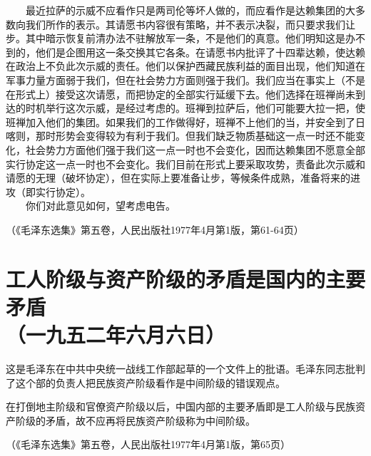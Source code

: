 \documentclass[cn,11pt,chinese]{elegantbook}
\def\myformat#1{\hfil\hfil #1}
\begin{document}
　　最近拉萨的示威不应看作只是两司伦等坏人做的，而应看作是达赖集团的大多数向我们所作的表示。其请愿书内容很有策略，并不表示决裂，而只要求我们让步。其中暗示恢复前清办法不驻解放军一条，不是他们的真意。他们明知这是办不到的，他们是企图用这一条交换其它各条。在请愿书内批评了十四辈达赖，使达赖在政治上不负此次示威的责任。他们以保护西藏民族利益的面目出现，他们知道在军事力量方面弱于我们，但在社会势力方面则强于我们。我们应当在事实上（不是在形式上）接受这次请愿，而把协定的全部实行延缓下去。他们选择在班禅尚未到达的时机举行这次示威，是经过考虑的。班禅到拉萨后，他们可能要大拉一把，使班禅加入他们的集团。如果我们的工作做得好，班禅不上他们的当，并安全到了日喀则，那时形势会变得较为有利于我们。但我们缺乏物质基础这一点一时还不能变化，社会势力方面他们强于我们这一点一时也不会变化，因而达赖集团不愿意全部实行协定这一点一时也不会变化。我们目前在形式上要采取攻势，责备此次示威和请愿的无理（破坏协定），但在实际上要准备让步，等候条件成熟，准备将来的进攻（即实行协定）。\\
　　你们对此意见如何，望考虑电告。\\
\begin{flushright}（《毛泽东选集》第五卷，人民出版社1977年4月第1版，第61-64页）\end{flushright}
\newpage\section*{\myformat{工人阶级与资产阶级的矛盾是国内的主要矛盾}\\\myformat{（一九五二年六月六日）}}
\begin{introduction}\item  这是毛泽东在中共中央统一战线工作部起草的一个文件上的批语。毛泽东同志批判了这个部的负责人把民族资产阶级看作是中间阶级的错误观点。\end{introduction}
在打倒地主阶级和官僚资产阶级以后，中国内部的主要矛盾即是工人阶级与民族资产阶级的矛盾，故不应再将民族资产阶级称为中间阶级。\\
\begin{flushright}（《毛泽东选集》第五卷，人民出版社1977年4月第1版，第65页）\end{flushright}
\newpage
\end{document}
